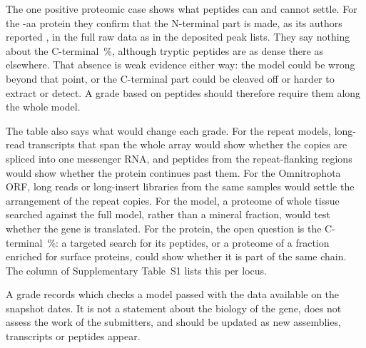 \documentclass[11pt]{article}
\begin{document}
The one positive proteomic case shows what peptides can and cannot settle. For the -aa
 protein they confirm that the N-terminal part is made, as its authors reported \citep{kizina2022},
in the full raw data as in the deposited peak lists. They say nothing about the C-terminal \,\%, although tryptic
peptides are as dense there as elsewhere. That absence is weak evidence either way: the model could be wrong beyond that
point, or the C-terminal part could be cleaved off or harder to extract or detect. A grade based on peptides should
therefore require them along the whole model.

The table also says what would change each grade. For the repeat models, long-read transcripts that span the whole array
would show whether the copies are spliced into one messenger RNA, and peptides from the repeat-flanking regions would show
whether the protein continues past them. For the Omnitrophota ORF, long reads or long-insert libraries from the same
samples would settle the arrangement of the repeat copies. For the  model, a proteome of whole tissue searched
against the full model, rather than a mineral fraction, would test whether the gene is translated. For the
 protein, the open question is the C-terminal \,\%: a targeted search for its peptides, or a
proteome of a fraction enriched for surface proteins, could show whether it is part of the same chain. The column
 of Supplementary Table~S1 lists this per locus.

A grade records which checks a model passed with the data available on the snapshot dates. It is not a statement about
the biology of the gene, does not assess the work of the submitters, and should be updated as new assemblies, transcripts
or peptides appear.
\end{document}
